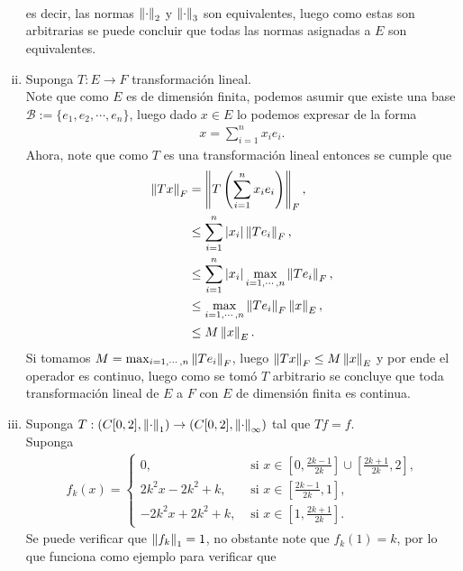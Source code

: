 \begin{homeworkProblem}
\begin{solution}
\begin{enumerate}[(i)]
\begin{align*}
        \end{align*}
        es decir, las normas $\left\|\cdot\right\|_{2}$ y $\left\|\cdot\right\|_{3}$ son equivalentes, luego como estas son arbitrarias se puede concluir que todas las normas asignadas a $E$ son equivalentes.
      \item Suponga $T:E\to F$ transformación lineal.\\
        Note que como $E$ es de dimensión finita, podemos asumir que existe una base\\
        $\mathcal{B}:=\{e_1,e_2,\cdots,e_n\}$, luego dado $x\in E$ lo podemos expresar de la forma
        \begin{align*}
          x=\sum_{i=1}^{n}x_ie_i.
        \end{align*}
        Ahora, note que como $T$ es una transformación lineal entonces se cumple que
        \begin{align*}
          \left\|Tx\right\|_{F}&=\left\|T\left( \sum_{i=1}^{n}x_ie_i \right)\right\|_{F},\\
          &\leq\sum_{i=1}^{n}|x_i|\left\|Te_i\right\|_{F},\\
          &\leq\sum_{i=1}^{n}|x_i|\max_{i=1,\cdots,n}\left\|Te_i\right\|_{F},\\
          &\leq \max_{i=1,\cdots,n}\left\|Te_i\right\|_{F} \left\|x\right\|_{E},\\
          &\leq M\left\|x\right\|_{E}.
        \end{align*}
        Si tomamos $M=\max_{i=1,\cdots,n}\left\|Te_i\right\|_{F}$, luego $\left\|Tx\right\|_{F}\leq M\left\|x\right\|_{E}$ y por ende el operador es continuo, luego como se tomó $T$ arbitrario se concluye que toda transformación lineal de $E$ a $F$ con $E$ de dimensión finita es continua.
      \item Suponga $T:(C[0,2],\left\|\cdot\right\|_{1})\to(C[0,2],\left\|\cdot\right\|_{\infty})$ tal que $Tf=f$.\\
      Suponga 
      \begin{align*}
        f_k(x)= 
        \begin{cases}
          0, &\text{ si } x\in\left[0,\frac{2k-1}{2k}\right]\cup\left[\frac{2k+1}{2k},2\right] \text{,} \\
          2k^2x-2k^2+k, &\text{ si } x\in\left[\frac{2k-1}{2k},1\right],\\
          -2k^2x+2k^2+k, &\text{ si } x\in\left[1,\frac{2k+1}{2k}\right].
        \end{cases}
      \end{align*}
      Se puede verificar que $\left\|f_k\right\|_{1}=1$, no obstante note que $f_{k}(1)=k$, por lo que funciona como ejemplo para verificar que

\end{enumerate}
\end{solution}
\end{homeworkProblem}
